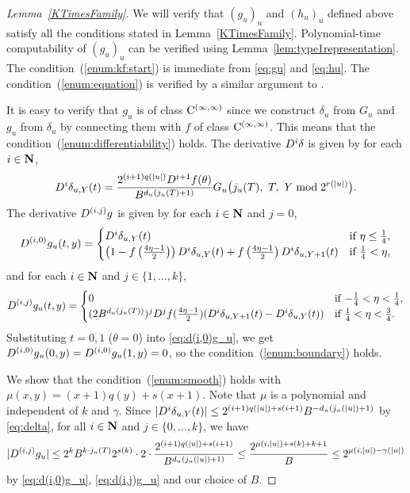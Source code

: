\begin{proof}[Lemma~\ref{KTimesFamily}]
We will verify that $(g_u)_u$ and $(h_u)_u$ defined above satisfy all the conditions stated in Lemma~\ref{KTimesFamily}.
Polynomial-time computability of $(g_u)_u$ can be verified using Lemma~\ref{lem:type1representation}.
The condition~(\ref{enum:kf:start}) is immediate from \eqref{eq:gu} and \eqref{eq:hu}.
The condition~(\ref{enum:equation}) is verified by a similar argument to
\cite[Lemma 4.1]{kawamura2010lipschitz}.

It is easy to verify that $g_u$ is of class $\mathrm C^{(\infty, \infty)}$ 
since we construct $\delta_u$ from $G_u$ and $g_u$ from $\delta_u$ by connecting them with $f$ of class $\mathrm C^{(\infty, \infty)}$.
This means that the condition~(\ref{enum:differentiability}) holds.
The derivative $D^i \delta$ is given by for each $i \in \mathbf N$,
\begin{equation}
    D^i \delta_{u,Y}(t) 
    = \frac{2^{(i+1)q(|u|)} D^{i+1}f(\theta)}{B^{d_u(j_u(T)+1)}}
    G_u\bigl( j_u(T),\ T,\ Y \bmod 2^{r(|u|)} \bigr).
\end{equation}
The derivative $D^{(i,j)} g$ is given by for each $i \in \mathbf N$ and $j=0$,
\begin{equation}
     D^{(i, 0)} g_u(t, y)
     = \begin{cases}
 	D^i \delta_{u, Y}(t) 
	& \text{if} \ \eta \le \frac 1 4, 
	\\
	\left( 1-f \left(\frac{4\eta-1}{2}\right)\right) 
	D^i \delta_{u, Y}(t)
	+ f \left(\frac{4\eta-1}{2}\right) D^i \delta_{u,Y+1}(t) 
	& \text{if} \ \frac 1 4 < \eta,
       \end{cases} \label{eq:d(i,0)g_u}
\end{equation}
and for each $i \in \mathbf N$ and $j \in \{1, \dots, k\}$,
  \begin{equation} \label{eq:d(i,j)g_u}
    D^{(i, j)} g_u(t, y)
     = \begin{cases}
	0 & \text{if} \ {-\frac 1 4} < \eta < \frac 1 4, \\
	(2B^{d_u(j_u(T))})^j D^j f(\frac{4\eta - 1}2)
	(D^i \delta_{u,Y+1}(t)-D^i \delta_{u, Y}(t)) 
	& \text{if} \ \frac 1 4 < \eta < \frac 3 4.
       \end{cases}
  \end{equation}
Substituting $t = 0, 1$ ($\theta = 0$) into \eqref{eq:d(i,0)g_u},
we get $D^{(i, 0)} g_u(0,y) = D^{(i, 0)} g_u(1,y) = 0$, 
so the condition~(\ref{enum:boundary}) holds.

We show that the condition~(\ref{enum:smooth}) holds with $\mu(x, y) = (x+1)q(y) + s(x+1)$.
Note that $\mu$ is a polynomial and independent of $k$ and $\gamma$.
Since $|D^i \delta_{u,Y}(t)| \le 2^{(i+1)q(|u|) + s(i+1)}B^{-d_u(j_u(|u|)+1)}$ by \eqref{eq:delta}, for all $i \in \mathbf N$ and $j \in \{0, \dots, k\}$, we have
 \begin{equation}
  |D^{(i,j)} g_u| 
   \le 
   2^k B^{k \cdot j_u(T)} 2^{s(k)} \cdot 2 \cdot 
   \frac{2^{(i+1)q(|u|) + s(i+1)}}{B^{d_u(j_u(|u|)+1)}} 
   \le
   \frac{2^{\mu(i, |u|) + s(k) + k + 1}}{B}
   \le
   2^{\mu(i, |u|) - \gamma(|u|)}
 \end{equation}
by \eqref{eq:d(i,0)g_u}, \eqref{eq:d(i,j)g_u} and our choice of $B$.


\end{proof}

